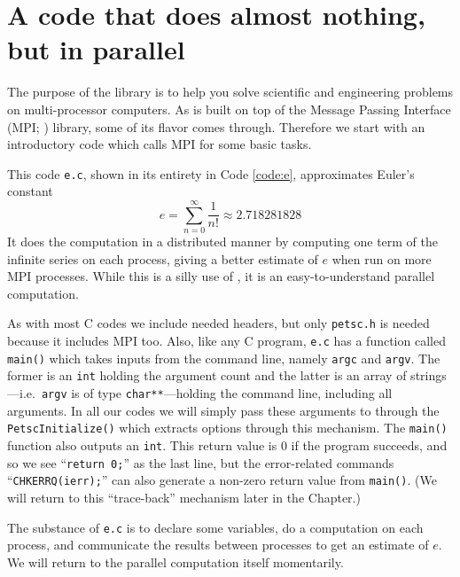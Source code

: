 
\section{A code that does almost nothing, but in parallel}

The purpose of the \PETSc library is to help you solve scientific and engineering problems on multi-processor computers.  As \PETSc is built on top of the Message Passing Interface (MPI; \citep{Groppetal1999}) library, some of its flavor comes through.  Therefore we start with an introductory \PETSc code which calls MPI for some basic tasks.

This code \texttt{e.c}, shown in its entirety in Code \ref{code:e}, approximates Euler's constant
\begin{equation}
e = \sum_{n = 0}^\infty \frac{1}{n!} \approx 2.718281828 \label{eq:gs:introseries}
\end{equation}
It does the computation in a distributed manner by computing one term of the infinite series on each process, giving a better estimate of $e$ when run on more MPI processes. While this is a silly use of \PETSc, it is an easy-to-understand parallel computation.

As with most C codes we include needed headers, but only \texttt{petsc.h} is needed because it includes MPI too.  Also, like any C program, \texttt{e.c} has a function called \texttt{main()} which takes inputs from the command line, namely \texttt{argc} and \texttt{argv}.  The former is an \texttt{int} holding the argument count and the latter is an array of strings---i.e.~\texttt{argv} is of type \texttt{char**}---holding the command line, including all arguments.  In all our codes we will simply pass these arguments to \PETSc through the \texttt{PetscInitialize()} which extracts options through this mechanism.  The \texttt{main()} function also outputs an \texttt{int}.  This return value is $0$ if the program succeeds, and so we see ``\texttt{return 0;}'' as the last line, but the error-related commands ``\texttt{CHKERRQ(ierr);}'' can also generate a non-zero return value from \texttt{main()}.  (We will return to this ``trace-back'' mechanism later in the Chapter.)

The substance of \texttt{e.c} is to declare some variables, do a computation on each process, and communicate the results between processes to get an estimate of $e$.  We will return to the parallel computation itself momentarily.



